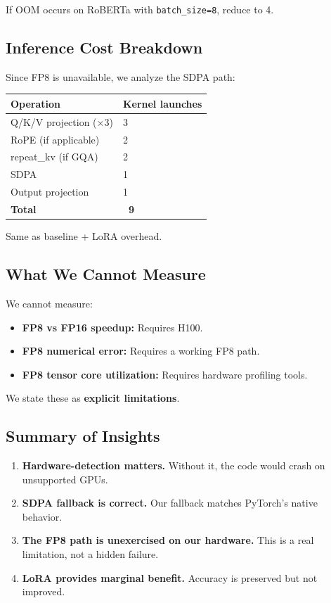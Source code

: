 If OOM occurs on RoBERTa with \texttt{batch\_size=8}, reduce to 4.

\subsection{Inference Cost Breakdown}

Since FP8 is unavailable, we analyze the SDPA path:

\begin{table}[H]
\centering
\small
\begin{tabular}{ll}
\toprule
\textbf{Operation} & \textbf{Kernel launches} \\
\midrule
Q/K/V projection ($\times$3) & 3 \\
RoPE (if applicable) & 2 \\
repeat\_kv (if GQA) & 2 \\
SDPA & 1 \\
Output projection & 1 \\
\textbf{Total} & \textbf{~9} \\
\bottomrule
\end{tabular}
\end{table}

Same as baseline + LoRA overhead.

\subsection{What We Cannot Measure}

We cannot measure:

\begin{itemize}
\item \textbf{FP8 vs FP16 speedup:} Requires H100.
\item \textbf{FP8 numerical error:} Requires a working FP8 path.
\item \textbf{FP8 tensor core utilization:} Requires hardware profiling tools.

\end{itemize}
We state these as \textbf{explicit limitations}.

\subsection{Summary of Insights}

\begin{enumerate}
\item \textbf{Hardware-detection matters.} Without it, the code would crash on
  unsupported GPUs.
\item \textbf{SDPA fallback is correct.} Our fallback matches PyTorch's native
  behavior.
\item \textbf{The FP8 path is unexercised on our hardware.} This is a real
  limitation, not a hidden failure.
\item \textbf{LoRA provides marginal benefit.} Accuracy is preserved but not
  improved.

\end{enumerate}
